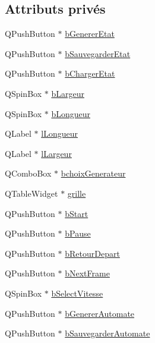 \subsection*{Attributs privés}
\begin{DoxyCompactItemize}
\item 
Q\+Push\+Button $\ast$ \mbox{\hyperlink{classfenetre2_d_aa9af7a3a720abb6202d30c3477a856bf}{b\+Generer\+Etat}}
\item 
Q\+Push\+Button $\ast$ \mbox{\hyperlink{classfenetre2_d_aaee91da5f6d10d3bf470681903a85c24}{b\+Sauvegarder\+Etat}}
\item 
Q\+Push\+Button $\ast$ \mbox{\hyperlink{classfenetre2_d_ae127446a0bc474509666c87573c61a0b}{b\+Charger\+Etat}}
\item 
Q\+Spin\+Box $\ast$ \mbox{\hyperlink{classfenetre2_d_a41a9750a0aab89bbed2474f886132ab0}{b\+Largeur}}
\item 
Q\+Spin\+Box $\ast$ \mbox{\hyperlink{classfenetre2_d_a414cf5a37d0c42a0ee320b3685c46b6e}{b\+Longueur}}
\item 
Q\+Label $\ast$ \mbox{\hyperlink{classfenetre2_d_adbabe53fe91516fe4e04f9ce3b33ead5}{l\+Longueur}}
\item 
Q\+Label $\ast$ \mbox{\hyperlink{classfenetre2_d_ab7d1100bfe92e079446ec678d2e5eae2}{l\+Largeur}}
\item 
Q\+Combo\+Box $\ast$ \mbox{\hyperlink{classfenetre2_d_a5ff8107a3ed214aa73dd1c0e199446f0}{bchoix\+Generateur}}
\item 
Q\+Table\+Widget $\ast$ \mbox{\hyperlink{classfenetre2_d_a4e00bc47d6d9fd128f3f17de54de1bb5}{grille}}
\item 
Q\+Push\+Button $\ast$ \mbox{\hyperlink{classfenetre2_d_a4a29fbcac9a78bcf6181941d85f3a632}{b\+Start}}
\item 
Q\+Push\+Button $\ast$ \mbox{\hyperlink{classfenetre2_d_a6f7e8fd8a462f99f32dd388ad56d21c5}{b\+Pause}}
\item 
Q\+Push\+Button $\ast$ \mbox{\hyperlink{classfenetre2_d_a2f435edfd5d520522c30e25e8b06805b}{b\+Retour\+Depart}}
\item 
Q\+Push\+Button $\ast$ \mbox{\hyperlink{classfenetre2_d_a8c8621de0f606d5f89f658264b6d3acb}{b\+Next\+Frame}}
\item 
Q\+Spin\+Box $\ast$ \mbox{\hyperlink{classfenetre2_d_a76527d6781913ee433a93d2d3345c432}{b\+Select\+Vitesse}}
\item 
Q\+Push\+Button $\ast$ \mbox{\hyperlink{classfenetre2_d_a27b32827c5f5ce5fa05a689db0e4df64}{b\+Generer\+Automate}}
\item 
Q\+Push\+Button $\ast$ \mbox{\hyperlink{classfenetre2_d_ae04be458a8dd0a075a16ea7ae51285ef}{b\+Sauvegarder\+Automate}}

\end{DoxyCompactItemize}
